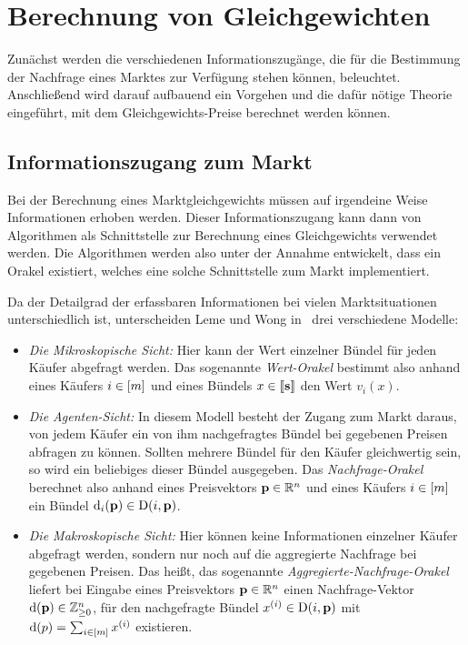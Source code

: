 \section{Berechnung von Gleichgewichten}

Zunächst werden die verschiedenen Informationszugänge, die für die Bestimmung  der Nachfrage eines Marktes zur Verfügung stehen können, beleuchtet.
Anschließend wird darauf aufbauend ein Vorgehen und die dafür nötige Theorie eingeführt, mit dem Gleichge\-wichts-Preise berechnet werden können.

\subsection{Informationszugang zum Markt}\label{section-market-access}

Bei der Berechnung eines Marktgleichgewichts müssen auf irgendeine Weise Informationen erhoben werden.
Dieser Informationszugang kann dann von Algorithmen als Schnittstelle zur Berechnung eines Gleichgewichts verwendet werden.
Die Algorithmen werden also unter der Annahme entwickelt, dass ein Orakel existiert, welches eine solche Schnittstelle zum Markt implementiert.

Da der Detailgrad der erfassbaren Informationen bei vielen Marktsituationen unterschiedlich ist, unterscheiden Leme und Wong in~\cite{PaesLeme2018} drei verschiedene Modelle:
\begin{itemize}
	\item \emph{Die Mikroskopische Sicht:} Hier kann der Wert einzelner Bündel für jeden Käufer abgefragt werden.
	Das sogenannte \emph{Wert-Orakel} bestimmt also anhand eines Käufers $i\in\left[ m \right]$ und eines Bündels $x\in\left\llbracket \mathbf{s} \right\rrbracket$ den Wert $v_i(x)$.
	\item \emph{Die Agenten-Sicht:} In diesem Modell besteht der Zugang zum Markt daraus, von jedem Käufer ein von ihm nachgefragtes Bündel bei gegebenen Preisen abfragen zu können.
	Sollten mehrere Bündel für den Käufer gleichwertig sein, so wird ein beliebiges dieser Bündel ausgegeben.
	Das \emph{Nachfrage-Orakel} berechnet also anhand eines Preisvektors $\mathbf{p}\in\mathbb{R}^n$ und eines Käufers $i\in\left[ m \right]$ ein Bündel $\operatorname{d}_i(\mathbf{p})\in\operatorname{D}(i, \mathbf{p})$.
	\item \emph{Die Makroskopische Sicht:} Hier können keine Informationen einzelner Käufer abgefragt werden, sondern nur noch auf die aggregierte Nachfrage bei gegebenen Preisen.
	Das heißt, das sogenannte \emph{Aggregierte-Nachfrage-Orakel} liefert bei Eingabe eines Preisvektors $\mathbf{p}\in\mathbb{R}^n$ einen Nachfrage-Vektor $\operatorname{d}(\mathbf{p})\in\mathbb{Z}_{\geq0}^n$, für den nachgefragte Bündel $x^{(i)} \in \operatorname{D}(i,\mathbf{p})$ mit $\operatorname{d}(p)=\sum_{i\in\left[ m \right]} x^{(i)}$ existieren.
\end{itemize}

